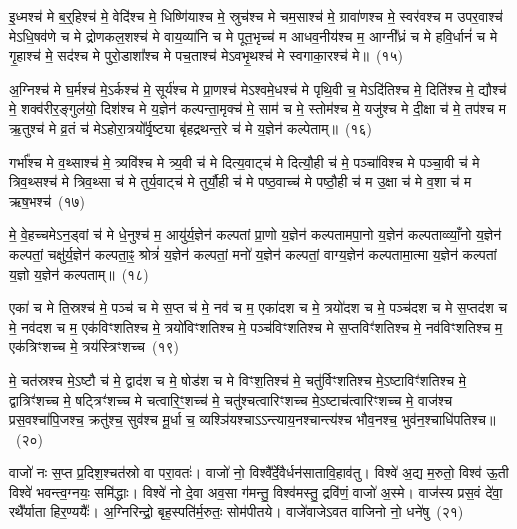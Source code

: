 इ॒ध्मश्च॑ मे ब॒र्॒\mbox{}हिश्च॑ मे॒ वेदि॑श्च मे॒ धिष्णि॑याश्च मे॒ स्रुच॑श्च मे चम॒साश्च॑ मे॒ ग्रावा॑णश्च मे॒ स्वर॑वश्च म उपर॒वाश्च॑ मे\-ऽधि॒षव॑णे च मे द्रोणकल॒शश्च॑ मे वाय॒व्या॑नि च मे पूत॒भृच्च॑ म आधव॒नीय॑श्च म॒ आग्नी᳚ध्रं च मे हवि॒र्धानं॑ च मे गृ॒हाश्च॑ मे॒ सद॑श्च मे पुरो॒डाशा᳚श्च मे पच॒ताश्च॑ मे\-ऽवभृ॒थश्च॑ मे स्वगाका॒रश्च॑ मे॥~(१५)

{\anuvakamend[{गृ॒हाश्च॒ षोड॑श च}]}%

अ॒ग्निश्च॑ मे घ॒र्मश्च॑ मे॒\-ऽर्कश्च॑ मे॒ सूर्य॑श्च मे प्रा॒णश्च॑ मे\-ऽश्वमे॒धश्च॑ मे पृथि॒वी च॒ मे\-ऽदि॑तिश्च मे॒ दिति॑श्च मे॒ द्यौश्च॑ मे॒ शक्व॑रीर॒ङ्गुल॑यो॒ दिश॑श्च मे य॒ज्ञेन॑ कल्पन्ता॒मृक्च॑ मे॒ साम॑ च मे॒ स्तोम॑श्च मे॒ यजु॑श्च मे दी॒क्षा च॑ मे॒ तप॑श्च म ऋ॒तुश्च॑ मे व्र॒तं च॑ मे\-ऽहोरा॒त्रयो᳚र्वृ॒ष्ट्या बृ॑हद्रथन्त॒रे च॑ मे य॒ज्ञेन॑ कल्पेताम्॥~(१६)

{\anuvakamend[{दी॒क्षा\-ऽष्टाद॑श च}]}%

गर्भा᳚श्च मे व॒थ्साश्च॑ मे॒ त्र्यवि॑श्च मे त्र्य॒वी च॑ मे दित्य॒वाट्च॑ मे दित्यौ॒ही च॑ मे॒ पञ्चा॑विश्च मे पञ्चा॒वी च॑ मे त्रिव॒थ्सश्च॑ मे त्रिव॒थ्सा च॑ मे तुर्य॒वाट्च॑ मे तुर्यौ॒ही च॑ मे पष्ठ॒वाच्च॑ मे पष्ठौ॒ही च॑ म उ॒क्षा च॑ मे व॒शा च॑ म ऋष॒भश्च॑~(१७)

मे॒ वे॒हच्चमे\-ऽन॒ड्वां च॑ मे धे॒नुश्च॑ म॒ आयु॑र्य॒ज्ञेन॑ कल्पतां प्रा॒णो य॒ज्ञेन॑ कल्पतामपा॒नो य॒ज्ञेन॑ कल्पताव्व्याँ॒नो य॒ज्ञेन॑ कल्पतां॒ चक्षु॑र्य॒ज्ञेन॑ कल्पता॒ꣴ॒ श्रोत्रं॑ य॒ज्ञेन॑ कल्पतां॒ मनो॑ य॒ज्ञेन॑ कल्पतां॒ वाग्य॒ज्ञेन॑ कल्पतामा॒त्मा य॒ज्ञेन॑ कल्पतां य॒ज्ञो य॒ज्ञेन॑ कल्पताम्॥~(१८)

{\anuvakamend[{ऋ॒ष॒भश्च॑ चत्वारि॒ꣳ॒शच्च॑}]}%

एका॑ च मे ति॒स्रश्च॑ मे॒ पञ्च॑ च मे स॒प्त च॑ मे॒ नव॑ च म॒ एका॑\-दश च मे॒ त्रयो॑दश च मे॒ पञ्च॑दश च मे स॒प्तद॑श च मे॒ नव॑दश च म॒ एक॑विꣳशतिश्च मे॒ त्रयो॑विꣳशतिश्च मे॒ पञ्च॑विꣳशतिश्च मे स॒प्तविꣳ॑शतिश्च मे॒ नव॑विꣳशतिश्च म॒ एक॑त्रिꣳशच्च मे॒ त्रय॑स्त्रिꣳशच्च~(१९)

मे॒ चत॑स्रश्च मे॒\-ऽष्टौ च॑ मे॒ द्वाद॑श च मे॒ षोड॑श च मे विꣳश॒तिश्च॑ मे॒ चतु॑र्विꣳशतिश्च मे॒\-ऽष्टाविꣳ॑शतिश्च मे॒ द्वात्रिꣳ॑शच्च मे॒ षट्त्रिꣳ॑शच्च मे चत्वारि॒ꣳ॒शच्च॑ मे॒ चतु॑श्चत्वारिꣳशच्च मे॒\-ऽष्टाच॑त्वारिꣳशच्च मे॒ वाज॑श्च प्रस॒वश्चा॑पि॒जश्च॒ क्रतु॑श्च॒ सुव॑श्च मू॒र्धा च॒ व्यश्ञि॑यश्चाऽऽन्त्याय॒नश्चान्त्य॑श्च भौव॒नश्च॒ भुव॑न॒श्चाधि॑पतिश्च॥~(२०)

{\anuvakamend[{त्रय॑स्त्रिꣳशच्च॒ व्यश्ञि॑य॒ एका॑\-दश च}]}%

वाजो॑ नः स॒प्त प्र॒दिश॒श्चत॑स्रो वा परा॒वतः॑। वाजो॑ नो॒ विश्वै᳚र्दे॒वैर्धन॑सातावि॒हाव॑तु। विश्वे॑ अ॒द्य म॒रुतो॒ विश्व॑ ऊ॒ती विश्वे॑ भवन्त्व॒ग्नयः॒ समि॑द्धाः। विश्वे॑ नो दे॒वा अव॒सा ग॑मन्तु॒ विश्व॑मस्तु॒ द्रवि॑णं॒ वाजो॑ अ॒स्मे। वाज॑स्य प्रस॒वं दे॑वा॒ रथै᳚र्याता हिर॒ण्ययैः᳚। अ॒ग्निरिन्द्रो॒ बृह॒स्पति॑र्म॒रुतः॒ सोम॑पीतये। वाजे॑वाजे\-ऽवत वाजिनो नो॒ धने॑षु~(२१)

